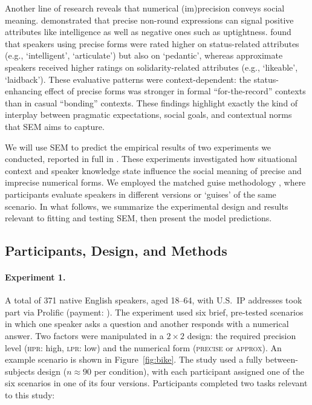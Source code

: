 \documentclass[12pt,a4paper]{article}
\newcommand{\xvar}[1]{\textsc{#1}}
\begin{document}
Another line of research reveals that numerical (im)precision conveys social
meaning. \citet{beltrama2018} demonstrated that precise non-round expressions can
signal positive attributes like intelligence as well as negative ones such as
uptightness. \citet{beltramaetal2022} found that speakers using precise forms were
rated higher on status-related attributes (e.g., `intelligent', `articulate') but
also on `pedantic', whereas approximate speakers received higher ratings on
solidarity-related attributes (e.g., `likeable', `laidback'). These evaluative
patterns were context-dependent: the status-enhancing effect of precise forms was
stronger in formal ``for-the-record'' contexts than in casual ``bonding'' contexts.
These findings highlight exactly the kind of interplay between pragmatic
expectations, social goals, and contextual norms that SEM aims to capture.

We will use SEM to predict the empirical results of two experiments we conducted,
reported in full in \citet{soltEtAl2025}. These experiments investigated how
situational context and speaker knowledge state influence the social meaning of
precise and imprecise numerical forms. We employed the matched guise methodology
\citep{campbellkibler2007}, where participants evaluate speakers in different
versions or `guises' of the same scenario. In what follows, we summarize the
experimental design and results relevant to fitting and testing SEM, then present
the model predictions.


\subsection{Participants, Design, and Methods}

\paragraph{Experiment 1.}
A total of 371 native English speakers, aged 18--64, with U.S.~IP addresses took
part via Prolific (payment: ). The experiment used six brief,
pre-tested scenarios in which one speaker asks a question and another responds
with a numerical answer. Two factors were manipulated in a $2 \times 2$ design:
the required precision level (\xvar{hpr}: high, \xvar{lpr}: low) and the
numerical form (\xvar{precise} or \xvar{approx}). An example scenario is shown
in Figure~\ref{fig:bike}. The study used a fully between-subjects design ($n
\approx 90$ per condition), with each participant assigned one of the six
scenarios in one of its four versions. Participants completed two tasks relevant
to this study:
\end{document}
